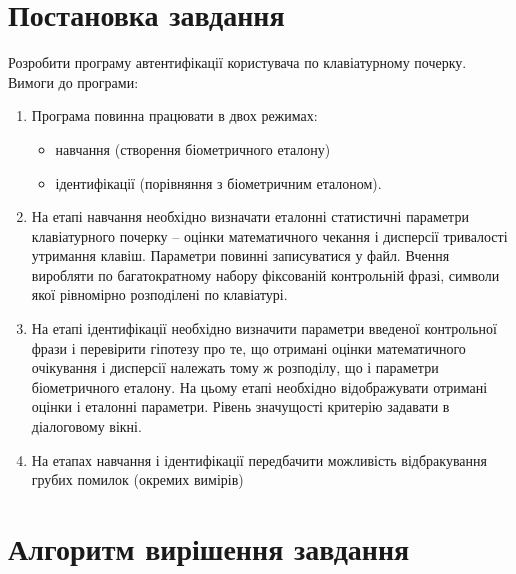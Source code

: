 \documentclass{dstu}
\begin{document}

\tableofcontents

\chapter{Постановка завдання}

Розробити програму автентифікації користувача по клавіатурному почерку.
Вимоги до програми:
\begin{enumerate}{}
	\item{
		Програма повинна працювати в двох режимах:
		\begin{itemize}
			\item навчання (створення біометричного еталону)
			\item  ідентифікації (порівняння з біометричним еталоном).
		\end{itemize}
	}

	\item На етапі навчання необхідно визначати еталонні статистичні параметри 
	клавіатурного почерку – оцінки математичного чекання і дисперсії 
	тривалості утримання клавіш. Параметри повинні записуватися у файл. 
	Вчення виробляти по багатократному набору фіксованій контрольній фразі, 
	символи якої рівномірно розподілені по клавіатурі.

	\item На етапі ідентифікації необхідно визначити параметри введеної 
контрольної фрази і перевірити гіпотезу про те, що отримані оцінки 
математичного очікування і дисперсії належать тому ж розподілу, що і 
параметри біометричного еталону. На цьому етапі необхідно відображувати 
отримані оцінки і еталонні параметри. Рівень значущості критерію задавати в 
діалоговому вікні.

	\item На етапах навчання і ідентифікації передбачити можливість 
відбракування грубих помилок (окремих вимірів)

\end{enumerate}

\chapter{Алгоритм вирішення завдання}
\end{document}
